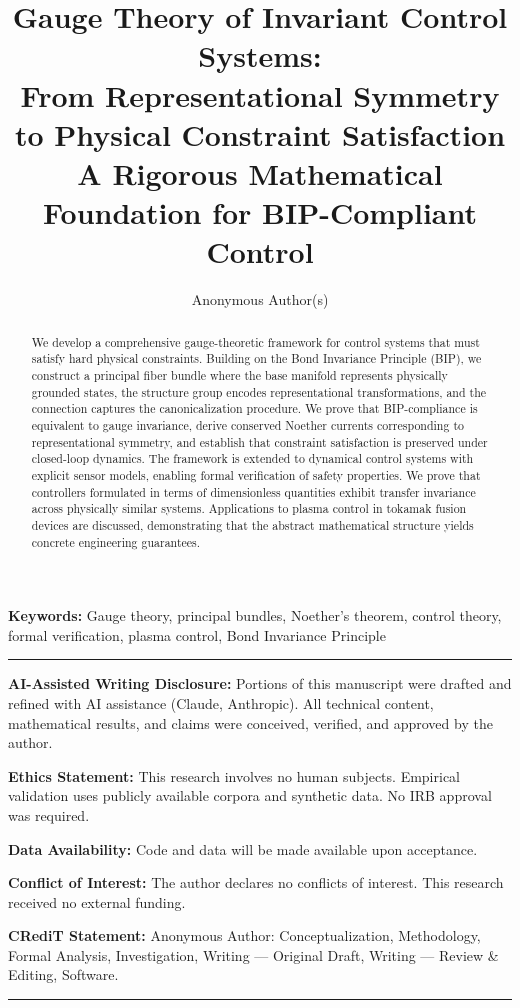 \documentclass[11pt]{article}
\title{Gauge Theory of Invariant Control Systems:\\
From Representational Symmetry to Physical Constraint Satisfaction\\[1em]
\large A Rigorous Mathematical Foundation for BIP-Compliant Control}
\author{Anonymous Author(s)}
\date{}
\begin{document}
\maketitle

\begin{abstract}
We develop a comprehensive gauge-theoretic framework for control systems that must
satisfy hard physical constraints. Building on the Bond Invariance Principle (BIP), we
construct a principal fiber bundle where the base manifold represents physically grounded
states, the structure group encodes representational transformations, and the connection
captures the canonicalization procedure. We prove that BIP-compliance is equivalent to
gauge invariance, derive conserved Noether currents corresponding to representational symmetry,
and establish that constraint satisfaction is preserved under closed-loop dynamics.
The framework is extended to dynamical control systems with explicit sensor models, enabling
formal verification of safety properties. We prove that controllers formulated in terms
of dimensionless quantities exhibit transfer invariance across physically similar systems. Applications
to plasma control in tokamak fusion devices are discussed, demonstrating that the
abstract mathematical structure yields concrete engineering guarantees.
\end{abstract}

\noindent\textbf{Keywords:} Gauge theory, principal bundles, Noether's theorem, control theory, formal
verification, plasma control, Bond Invariance Principle

\vspace{1em}
\noindent\rule{\linewidth}{0.4pt}
\small
\noindent\textbf{AI-Assisted Writing Disclosure:} Portions of this manuscript were drafted and refined with AI assistance (Claude, Anthropic). All technical content, mathematical results, and claims were conceived, verified, and approved by the author.

\noindent\textbf{Ethics Statement:} This research involves no human subjects. Empirical validation uses publicly available corpora and synthetic data. No IRB approval was required.

\noindent\textbf{Data Availability:} Code and data will be made available upon acceptance.

\noindent\textbf{Conflict of Interest:} The author declares no conflicts of interest. This research received no external funding.

\noindent\textbf{CRediT Statement:} Anonymous Author: Conceptualization, Methodology, Formal Analysis, Investigation, Writing --- Original Draft, Writing --- Review \& Editing, Software.
\noindent\rule{\linewidth}{0.4pt}
\normalsize
\vspace{1em}
\end{document}
